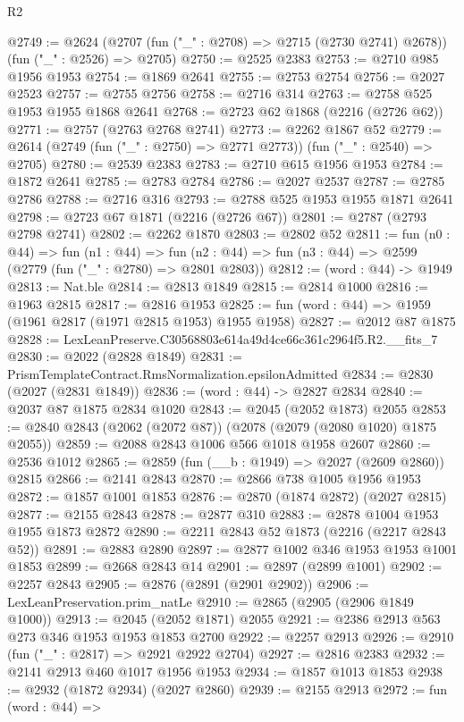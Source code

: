 \begin{lexlean}{R2}
\begin{coremodule}
@2749 := @2624 (@2707 (fun ("_" : @2708) => @2715 (@2730 @2741) @2678)) (fun ("_" : @2526) => @2705)
@2750 := @2525 @2383
@2753 := @2710 @985 @1956 @1953
@2754 := @1869 @2641
@2755 := @2753 @2754
@2756 := @2027 @2523
@2757 := @2755 @2756
@2758 := @2716 @314
@2763 := @2758 @525 @1953 @1955 @1868 @2641
@2768 := @2723 @62 @1868 (@2216 (@2726 @62))
@2771 := @2757 (@2763 @2768 @2741)
@2773 := @2262 @1867 @52
@2779 := @2614 (@2749 (fun ("_" : @2750) => @2771 @2773)) (fun ("_" : @2540) => @2705)
@2780 := @2539 @2383
@2783 := @2710 @615 @1956 @1953
@2784 := @1872 @2641
@2785 := @2783 @2784
@2786 := @2027 @2537
@2787 := @2785 @2786
@2788 := @2716 @316
@2793 := @2788 @525 @1953 @1955 @1871 @2641
@2798 := @2723 @67 @1871 (@2216 (@2726 @67))
@2801 := @2787 (@2793 @2798 @2741)
@2802 := @2262 @1870
@2803 := @2802 @52
@2811 := fun (n0 : @44) =>
  fun (n1 : @44) =>
  fun (n2 : @44) => fun (n3 : @44) => @2599 (@2779 (fun ("_" : @2780) => @2801 @2803))
@2812 := (word : @44) -> @1949
@2813 := Nat.ble
@2814 := @2813 @1849
@2815 := @2814 @1000
@2816 := @1963 @2815
@2817 := @2816 @1953
@2825 := fun (word : @44) => @1959 (@1961 @2817 (@1971 @2815 @1953) @1955 @1958)
@2827 := @2012 @87 @1875
@2828 := LexLeanPreserve.C30568803e614a49d4ce66c361c2964f5.R2.__fits_7
@2830 := @2022 (@2828 @1849)
@2831 := PrismTemplateContract.RmsNormalization.epsilonAdmitted
@2834 := @2830 (@2027 (@2831 @1849))
@2836 := (word : @44) -> @2827 @2834
@2840 := @2037 @87 @1875 @2834 @1020
@2843 := @2045 (@2052 @1873) @2055
@2853 := @2840 @2843 (@2062 (@2072 @87)) (@2078 (@2079 (@2080 @1020) @1875 @2055))
@2859 := @2088 @2843 @1006 @566 @1018 @1958 @2607
@2860 := @2536 @1012
@2865 := @2859 (fun (__b : @1949) => @2027 (@2609 @2860)) @2815
@2866 := @2141 @2843
@2870 := @2866 @738 @1005 @1956 @1953
@2872 := @1857 @1001 @1853
@2876 := @2870 (@1874 @2872) (@2027 @2815)
@2877 := @2155 @2843
@2878 := @2877 @310
@2883 := @2878 @1004 @1953 @1955 @1873 @2872
@2890 := @2211 @2843 @52 @1873 (@2216 (@2217 @2843 @52))
@2891 := @2883 @2890
@2897 := @2877 @1002 @346 @1953 @1953 @1001 @1853
@2899 := @2668 @2843 @14
@2901 := @2897 (@2899 @1001)
@2902 := @2257 @2843
@2905 := @2876 (@2891 (@2901 @2902))
@2906 := LexLeanPreservation.prim_natLe
@2910 := @2865 (@2905 (@2906 @1849 @1000))
@2913 := @2045 (@2052 @1871) @2055
@2921 := @2386 @2913 @563 @273 @346 @1953 @1953 @1853 @2700
@2922 := @2257 @2913
@2926 := @2910 (fun ("_" : @2817) => @2921 @2922 @2704)
@2927 := @2816 @2383
@2932 := @2141 @2913 @460 @1017 @1956 @1953
@2934 := @1857 @1013 @1853
@2938 := @2932 (@1872 @2934) (@2027 @2860)
@2939 := @2155 @2913
@2972 := fun (word : @44) =>

\end{coremodule}
\end{lexlean}
